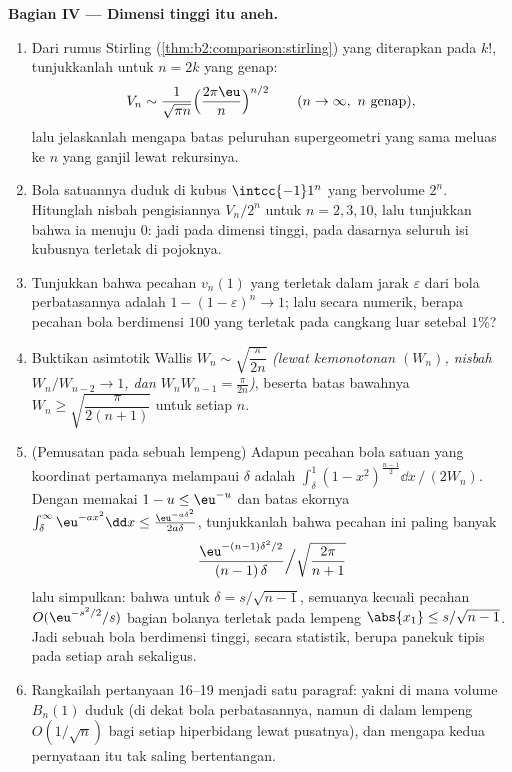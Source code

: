 \begin{problem}[{Soal akhir pekan --- $V_n =
\pi^{n/2}/\Gamma(\frac n2 + 1)$, dan keanehan dimensi
tinggi}]
\medskip
\noindent\textbf{Bagian IV --- Dimensi tinggi itu aneh.}
\begin{enumerate}[resume]
  \item Dari rumus Stirling
        (\cref{thm:b2:comparison:stirling}) yang diterapkan pada $k!$,
        tunjukkanlah untuk $n = 2k$ yang genap:
        \[
        V_n \sim \frac{1}{\sqrt{\pi n}}
        \Bigl(\frac{2\pi\eu}{n}\Bigr)^{n/2}
        \qquad (n \to \infty, \ n \text{ genap}),
        \]
        lalu jelaskanlah mengapa batas peluruhan supergeometri yang sama
        meluas ke $n$ yang ganjil lewat rekursinya.
  \item Bola satuannya duduk di kubus $\intcc{-1}1^n$ yang
        bervolume $2^n$. Hitunglah nisbah pengisiannya $V_n/2^n$ untuk
        $n = 2, 3, 10$, lalu tunjukkan bahwa ia menuju $0$: jadi pada dimensi
        tinggi, pada dasarnya seluruh isi kubusnya terletak di
        pojoknya.
  \item Tunjukkan bahwa pecahan $v_n(1)$ yang terletak dalam
        jarak $\varepsilon$ dari bola perbatasannya adalah $1 -
        (1 - \varepsilon)^n \to 1$; lalu secara numerik, berapa
        pecahan bola berdimensi $100$ yang terletak pada
        cangkang luar setebal $1\%$?
  \item Buktikan asimtotik Wallis $W_n \sim
        \sqrt{\dfrac{\pi}{2n}}$ \emph{(lewat kemonotonan
        $(W_n)$, nisbah $W_n/W_{n-2} \to 1$, dan $W_nW_{n-1}
        = \frac\pi{2n}$)}, beserta batas bawahnya $W_n \geq
        \sqrt{\dfrac{\pi}{2(n+1)}}$ untuk setiap $n$.
  \item (Pemusatan pada sebuah lempeng) Adapun pecahan bola satuan
        yang koordinat pertamanya melampaui $\delta$ adalah
        $\int_\delta^1(1 - x^2)^{\frac{n-1}2}\dd x \,\big/\,
        (2W_n)$. Dengan memakai $1 - u \leq \eu^{-u}$ dan batas
        ekornya $\int_\delta^\infty \eu^{-a x^2}\dd x \leq
        \frac{\eu^{-a\delta^2}}{2a\delta}$, tunjukkanlah bahwa pecahan
        ini paling banyak
        \[
        \frac{\eu^{-(n-1)\delta^2/2}}{(n-1)\,\delta}
        \Big/ \sqrt{\frac{2\pi}{n+1}}
        \]
        lalu simpulkan: bahwa untuk $\delta = s/\sqrt{n-1}$, semuanya kecuali
        pecahan $O(\eu^{-s^2/2}/s)$ bagian bolanya terletak pada
        lempeng $\abs{x_1} \leq s/\sqrt{n-1}$. Jadi sebuah bola berdimensi
        tinggi, secara statistik, berupa panekuk tipis pada setiap
        arah sekaligus.
  \item Rangkailah pertanyaan 16--19 menjadi satu paragraf: yakni di mana
        volume $B_n(1)$ duduk (di dekat bola
        perbatasannya, namun di dalam lempeng $O(1/\sqrt n)$ bagi setiap
        hiperbidang lewat pusatnya), dan mengapa kedua
        pernyataan itu tak saling bertentangan.
\end{enumerate}


\end{problem}
